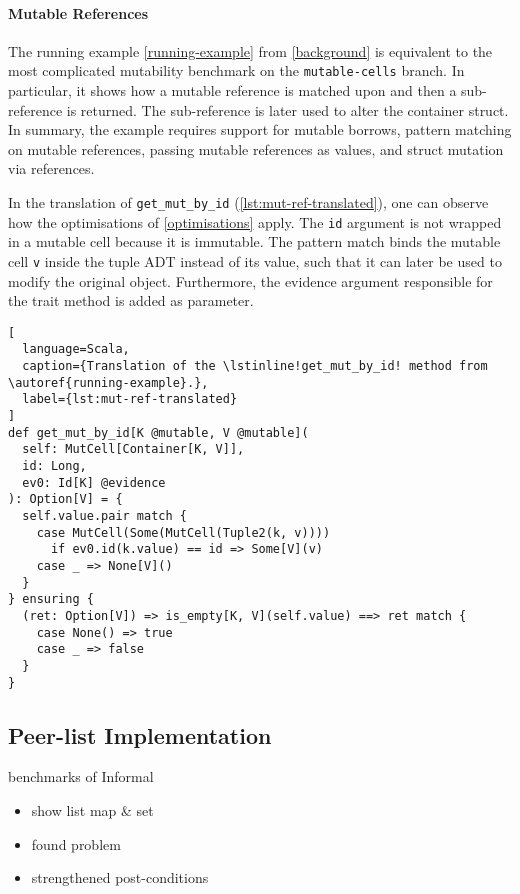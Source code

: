 \paragraph{Mutable References}

The running example \autoref{running-example} from \autoref{background} is
equivalent to the most complicated mutability benchmark on the
\texttt{mutable-cells} branch. In particular, it shows how a mutable reference
is matched upon and then a sub-reference is returned. The sub-reference is later
used to alter the container struct. In summary, the example requires support for
mutable borrows, pattern matching on mutable references, passing mutable
references as values, and struct mutation via references.

In the translation of \lstinline!get_mut_by_id!
(\autoref{lst:mut-ref-translated}), one can observe how the optimisations of
\autoref{optimisations} apply. The \lstinline!id! argument is not wrapped in a
mutable cell because it is immutable. The pattern match binds the mutable cell
\lstinline!v! inside the tuple ADT instead of its value, such that it can later
be used to modify the original object. Furthermore, the evidence argument
responsible for the trait method is added as parameter.

\begin{lstlisting}[
  language=Scala,
  caption={Translation of the \lstinline!get_mut_by_id! method from \autoref{running-example}.},
  label={lst:mut-ref-translated}
]
def get_mut_by_id[K @mutable, V @mutable](
  self: MutCell[Container[K, V]],
  id: Long,
  ev0: Id[K] @evidence
): Option[V] = {
  self.value.pair match {
    case MutCell(Some(MutCell(Tuple2(k, v))))
      if ev0.id(k.value) == id => Some[V](v)
    case _ => None[V]()
  }
} ensuring {
  (ret: Option[V]) => is_empty[K, V](self.value) ==> ret match {
    case None() => true
    case _ => false
  }
}
\end{lstlisting}

\subsection{Peer-list Implementation}
\label{peerlist}

benchmarks of Informal

\begin{itemize}
  \item show list map \& set
  \item found problem
  \item strengthened post-conditions
\end{itemize}
